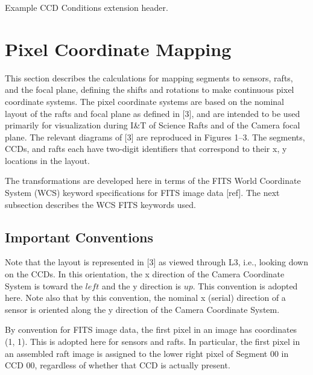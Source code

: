 \documentclass{article}[12pt]
\begin{document}
\begin{table}
\begin{alltt}

\end{alltt}
\caption{Example CCD Conditions extension header.\label{table:ccd_cond}}
\end{table}


\section{Pixel Coordinate Mapping}
This section describes the calculations for mapping segments to sensors, rafts, and the focal plane, defining the shifts and rotations to make continuous pixel coordinate systems.  The pixel coordinate systems are based on the nominal layout of the rafts and focal plane as defined in [3], and are intended to be used primarily for visualization during I\&T of Science Rafts and of the Camera focal plane.  The relevant diagrams of [3] are reproduced in Figures 1--3.  The segments, CCDs, and rafts each have two-digit identifiers that correspond to their x, y locations in the layout.

The transformations are developed here in terms of the FITS World Coordinate System (WCS) keyword specifications for FITS image data [ref].  The next subsection describes the WCS FITS keywords used.




\subsection{Important Conventions}
Note that the layout is represented in [3] as viewed through L3, i.e., looking down on the CCDs.  In this orientation, the x direction of the Camera Coordinate System is toward the $left$ and the y direction is $up$.  This convention is adopted here.  Note also that by this convention, the nominal x (serial) direction of a sensor is oriented along the y direction of the Camera Coordinate System.  

By convention for FITS image data, the first pixel in an image has coordinates (1, 1).  This is adopted here for sensors and rafts.  In particular, the first pixel in an assembled raft image is assigned to the lower right pixel of Segment 00 in CCD 00, regardless of whether that CCD is actually present.  
\end{document}
